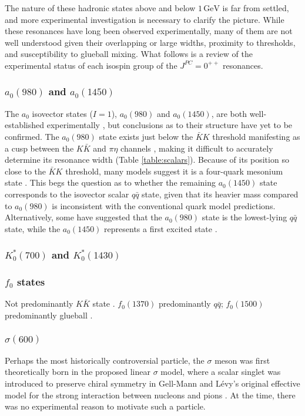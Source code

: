 \documentclass[aps,prd,onecolumn,showpacs,amsmath,amssymb,nofootinbib, 11pt]{revtex4} \pdfoutput=1
\newcommand{\gev}{\mathrm{GeV}}
\begin{document}
The nature of these hadronic states above and below $1\,\gev$ is far from settled, and more experimental investigation is necessary to clarify the picture. While these resonances have long been observed experimentally, many of them are not well understood given their overlapping or large widths, proximity to thresholds, and susceptibility to glueball mixing. What follows is a review of the experimental status of each isospin group of the $J^{PC}=0^{++}$ resonances. 
\subsubsection{$a_{0}(980)$ and $a_{0}(1450)$}
The $a_0$ isovector states ($I=1$), $a_{0}(980)$ and $a_{0}(1450)$, are both well-established experimentally \cite{Abele1998}, but conclusions as to their structure have yet to be confirmed. The $a_{0}(980)$ state exists just below the $\bar K K$ threshold manifesting as a cusp between the $K\bar K$ and $\pi \eta$ channels \cite{Uehara2002}, making it difficult to accurately determine its resonance width (Table \ref{table:scalars}). Because of its position so close to the $\bar K K$ threshold, many models suggest it is a four-quark mesonium state \cite{Mathur2007, Achasov2010,Zhang2011}. This begs the question as to whether the remaining $a_{0}(1450)$ state corresponds to the isovector scalar $q\bar q$ state, given that its heavier mass compared to $a_{0}(980)$ is inconsistent with the conventional quark model predictions. Alternatively, some have suggested that the $a_0(980)$ state is the lowest-lying $q\bar q$ state, while the $a_0(1450)$ represents a first excited state \cite{Zhang2011}. 
\subsubsection{$K^{*}_{0}(700)$ and $K^{*}_{0}(1430)$}

\subsubsection{$f_0$ states}

Not predominantly $K\bar{K}$ state \cite{Lee2013}.
$f_0(1370)$ predominantly $q\bar q$; $f_0(1500)$ predominantly glueball \cite{Janowski2011}.

\subsubsection{$\sigma(600)$}
Perhaps the most historically controversial particle, the $\sigma$ meson was first theoretically born in the proposed linear $\sigma$ model, where a scalar singlet was introduced to preserve chiral symmetry in Gell-Mann and L\'evy's original effective model for the strong interaction between nucleons and pions \cite{GellMann1960}. At the time, there was no experimental reason to motivate such a particle. 
\end{document}
